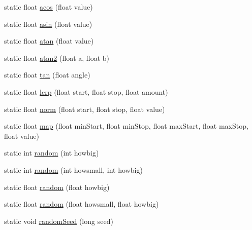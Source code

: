 \begin{DoxyCompactItemize}
\item 
static float \hyperlink{classit_1_1sephiroth_1_1android_1_1library_1_1util_1_1_math_utils_abe0e72c5c1ec979ee040970cb7eac7fd}{acos} (float value)
\item 
static float \hyperlink{classit_1_1sephiroth_1_1android_1_1library_1_1util_1_1_math_utils_a8f2fb2674a6f1d58712daec713d378bb}{asin} (float value)
\item 
static float \hyperlink{classit_1_1sephiroth_1_1android_1_1library_1_1util_1_1_math_utils_aeb3229a532766dff4acc2fdba8933e31}{atan} (float value)
\item 
static float \hyperlink{classit_1_1sephiroth_1_1android_1_1library_1_1util_1_1_math_utils_a5cfdc7149067034461263a3e2f387dd0}{atan2} (float a, float b)
\item 
static float \hyperlink{classit_1_1sephiroth_1_1android_1_1library_1_1util_1_1_math_utils_af21fc1258ec2cda8a93ef56f7a00dac7}{tan} (float angle)
\item 
static float \hyperlink{classit_1_1sephiroth_1_1android_1_1library_1_1util_1_1_math_utils_a81431d37ab5595684a8f77985c507d18}{lerp} (float start, float stop, float amount)
\item 
static float \hyperlink{classit_1_1sephiroth_1_1android_1_1library_1_1util_1_1_math_utils_a6d91f9b77bd1e157a77caa64fbc1c37d}{norm} (float start, float stop, float value)
\item 
static float \hyperlink{classit_1_1sephiroth_1_1android_1_1library_1_1util_1_1_math_utils_a1c550e242181125aba3bc7fee07fbcb8}{map} (float min\+Start, float min\+Stop, float max\+Start, float max\+Stop, float value)
\item 
static int \hyperlink{classit_1_1sephiroth_1_1android_1_1library_1_1util_1_1_math_utils_ad0fcbbab4bc242599ec4a61a4c8b815e}{random} (int howbig)
\item 
static int \hyperlink{classit_1_1sephiroth_1_1android_1_1library_1_1util_1_1_math_utils_a3ab9b851f885727f438128b051d96525}{random} (int howsmall, int howbig)
\item 
static float \hyperlink{classit_1_1sephiroth_1_1android_1_1library_1_1util_1_1_math_utils_a7b6e68fd887059cc82cc1d659aecc6fd}{random} (float howbig)
\item 
static float \hyperlink{classit_1_1sephiroth_1_1android_1_1library_1_1util_1_1_math_utils_a8e5a04b46c065a51a3317ce4df07606b}{random} (float howsmall, float howbig)
\item 
static void \hyperlink{classit_1_1sephiroth_1_1android_1_1library_1_1util_1_1_math_utils_abacff8f36b80a6292c950901c1e3c3c2}{random\+Seed} (long seed)
\end{DoxyCompactItemize}


